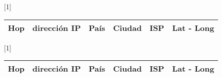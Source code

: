 
\begin{center}
\scalebox{0.7}[1]{
 \begin{tabular}{|l|l|l|l|l|l|}
    \hline
    Hop & dirección IP & País & Ciudad & ISP & Lat - Long 	\\
    \hline

    \hline
 \end{tabular}}
\end{center}


\begin{center}
\scalebox{0.7}[1]{
 \begin{tabular}{|l|l|l|l|l|l|}
    \hline
    Hop & dirección IP & País & Ciudad & ISP & Lat - Long 	\\
    \hline

    \hline
 \end{tabular}}
\end{center}

